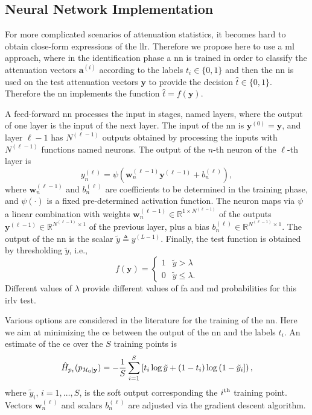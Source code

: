 \documentclass[conference]{IEEEtran}
\newcommand{\hatcross}{\hat{H}_{p_t}(p_{\mathcal{H}_0|\bf y})}
\begin{document}
\subsection{Neural Network Implementation}\label{sec:nn}

For more complicated scenarios of attenuation statistics, it becomes hard to obtain close-form expressions of the \ac{llr}. Therefore we propose here to use a \ac{ml} approach, where in the identification phase a \ac{nn} is trained in order to classify the attenuation vectors $\bm{a}^{(i)}$ according to the labels $t_i \in \{0,1\}$ and then the \ac{nn} is used on the test attenuation vectors $\bm{y}$ to provide the decision $\hat{t} \in \{0,1\}$. Therefore the \ac{nn} implements the function $\hat{t} = f(\bm{y})$.

A feed-forward \ac{nn} processes the input in stages, named layers, where the output of one layer is the input of the next layer. The input of the \ac{nn} is $\bm{y}^{(0)} = \bm{y}$, and layer $\ell-1$ has $N^{(\ell-1)}$ outputs obtained by processing the inputs with $N^{(\ell-1)}$ functions named neurons. The output of the $n$-th neuron of the $\ell$-th layer is
\begin{equation}\label{eq:nonLin}
y_n^{(\ell)} = \psi\left( \bm{w}_n^{(\ell -1)}\bm{y}^{(\ell-1)}+b_n^{(\ell)} \right),
\end{equation}
where $\bm{w}_n^{(\ell -1)}$ and $b_n^{(\ell)}$ are coefficients to be determined in the training phase, and $\psi(\cdot)$ is a fixed pre-determined activation function. The neuron maps via  $\psi$ a  linear combination with weights $\bm{w}_n^{(\ell -1)}\in \mathbb{R}^{1\times N^{(\ell-1)}}$ of the outputs $\bm{y}^{(\ell-1)} \in \mathbb{R}^{N^{(\ell-1)} \times 1 }$ of the previous layer, plus a bias $b_n^{(\ell)} \in \mathbb{R}^{N^{(\ell-1)} \times 1 }$. The output of the \ac{nn} is the scalar $\tilde{y} \triangleq y^{(L-1)}$. Finally, the test function is obtained by thresholding $\tilde{y}$, i.e.,
\begin{equation}
    f(\bm{y}) = \begin{cases}
    1 & \tilde{y} > \lambda \\
    0 & \tilde{y} \leq \lambda.
    \end{cases}
\end{equation}
Different values of $\lambda$ provide different values of \ac{fa} and \ac{md} probabilities for this \ac{irlv} test.

Various options are considered in the literature for the training of the \ac{nn}. Here we aim at minimizing the \ac{ce} between the output of the \ac{nn} and the labels $t_i$. An estimate of the \ac{ce} over the $S$ training points is 
\begin{equation}\label{eq:ce}
\hatcross = -\frac{1}{S} \sum_{i=1}^{S}\left[t_i\log \tilde{y} +\left(1-t_i\right)\log\left(1-\tilde{y}_i\right] \right),
\end{equation}
where $\tilde{y}_i$, $i=1, \ldots, S$, is the soft output corresponding the $i^{\rm th}$  training point. Vectors $\bm{w}_n^{(\ell)}$ and scalars $b_n^{(\ell)}$ are adjusted via the gradient descent algorithm. 
\end{document}
